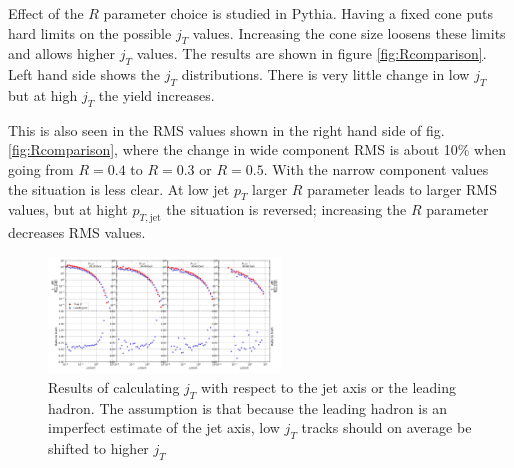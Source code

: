 Effect of the $R$ parameter choice is studied in Pythia. Having a fixed cone puts hard limits on the possible $j_T$ values. Increasing the cone size loosens these limits and allows higher $j_T$ values. The results are shown in figure \ref{fig:Rcomparison}. Left hand side shows the $j_T$ distributions. There is very little change in low $j_T$ but at high $j_T$ the yield increases. 

This is also seen in the RMS values shown in the right hand side of fig. \ref{fig:Rcomparison}, where the change in wide component RMS is about 10\% when going from $R=0.4$ to $R=0.3$ or $R=0.5$. With the narrow component values the situation is less clear. At low jet $p_T$ larger $R$ parameter leads to larger RMS values, but at hight $p_{T,\mathrm{jet}}$ the situation is reversed; increasing the $R$ parameter decreases RMS values.

\begin{figure}[htp]
\centering
\includegraphics[width=0.55\textwidth]{figures/ToyMCLeadingJtTest_50M_events}
\caption{Results of calculating $j_T$ with respect to the jet axis or the leading hadron. The assumption is that because the leading hadron is an imperfect estimate of the jet axis, low $j_T$ tracks should on average be shifted to higher $j_T$}
\end{figure}


